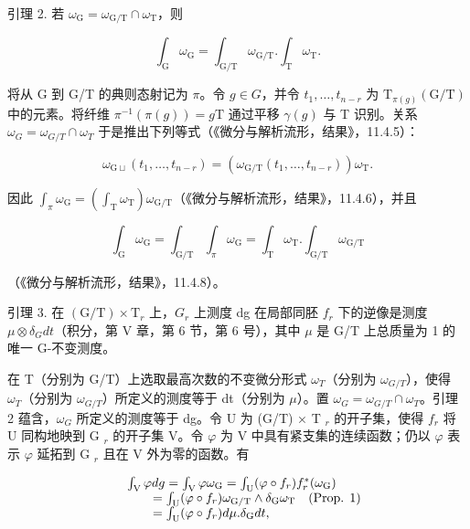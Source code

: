 引理 2. 若 \(\omega_{\mathrm{G}} = \omega_{\mathrm{G / T}}\cap \omega_{\mathrm{T}}\)，则

\[
\int_ {\mathrm{G}} \omega_ {\mathrm{G}} = \int_ {\mathrm{G/T}} \omega_ {\mathrm{G/T}}. \int_ {\mathrm{T}} \omega_ {\mathrm{T}}.
\]

将从 G 到 G/T 的典则态射记为 \(\pi\)。令 \(g \in G\)，并令 \(t_{1}, \ldots, t_{n-r}\) 为 \(\mathrm{T}_{\pi(g)}(\mathrm{G}/\mathrm{T})\) 中的元素。将纤维 \(\pi^{-1}(\pi(g)) = g\mathrm{T}\) 通过平移 \(\gamma(g)\) 与 T 识别。关系 \(\omega_{G} = \omega_{G/T} \cap \omega_{T}\) 于是推出下列等式（《微分与解析流形，结果》，11.4.5）：

\[
\omega_ {\mathrm{G} \sqcup} (t _ {1}, \dots , t _ {n - r}) = (\omega_ {\mathrm{G} / \mathrm{T}} (t _ {1}, \dots , t _ {n - r})) \omega_ {\mathrm{T}}.
\]

因此 \(\int_{\pi}\omega_{\mathrm{G}} = \left(\int_{\mathrm{T}}\omega_{\mathrm{T}}\right)\omega_{\mathrm{G / T}}\)（《微分与解析流形，结果》，11.4.6），并且

\[
\int_ {\mathrm{G}} \omega_ {\mathrm{G}} = \int_ {\mathrm{G/T}} \int_ {\pi} \omega_ {\mathrm{G}} = \int_ {\mathrm{T}} \omega_ {\mathrm{T}}. \int_ {\mathrm{G/T}} \omega_ {\mathrm{G/T}}
\]

（《微分与解析流形，结果》，11.4.8）。

引理 3. 在 \((\mathrm{G}/\mathrm{T}) \times \mathrm{T}_{r}\) 上，\(G_{r}\) 上测度 dg 在局部同胚 \(f_{r}\) 下的逆像是测度 \(\mu \otimes \delta_{G} dt\)（积分，第 V 章，第 6 节，第 6 号），其中 \(\mu\) 是 G/T 上总质量为 1 的唯一 G-不变测度。

在 T（分别为 G/T）上选取最高次数的不变微分形式 \(\omega_{T}\)（分别为 \(\omega_{G/T}\)），使得 \(\omega_{T}\)（分别为 \(\omega_{G/T}\)）所定义的测度等于 dt（分别为 \(\mu\)）。置 \(\omega_{G} = \omega_{G/T} \cap \omega_{T}\)。引理 2 蕴含，\(\omega_{G}\) 所定义的测度等于 dg。令 U 为 (G/T) × T \(_{r}\) 的开子集，使得 \(f_{r}\) 将 U 同构地映到 G \(_{r}\) 的开子集 V。令 \(\varphi\) 为 V 中具有紧支集的连续函数；仍以 \(\varphi\) 表示 \(\varphi\) 延拓到 G \(_{r}\) 且在 V 外为零的函数。有

\[
\begin{array}{r l} & {\int_ {\mathrm{V}} \varphi d g = \int_ {\mathrm{V}} \varphi \omega_ {\mathrm{G}} = \int_ {\mathrm{U}} (\varphi \circ f _ {r}) f _ {r} ^ {*} (\omega_ {\mathrm{G}})} \\ & {\qquad = \int_ {\mathrm{U}} (\varphi \circ f _ {r}) \omega_ {\mathrm{G/T}} \wedge \delta_ {\mathrm{G}} \omega_ {\mathrm{T}} \quad (\text {Prop. 1})} \\ & {\qquad = \int_ {\mathrm{U}} (\varphi \circ f _ {r}) d \mu . \delta_ {\mathrm{G}} d t,} \end{array}
\]

